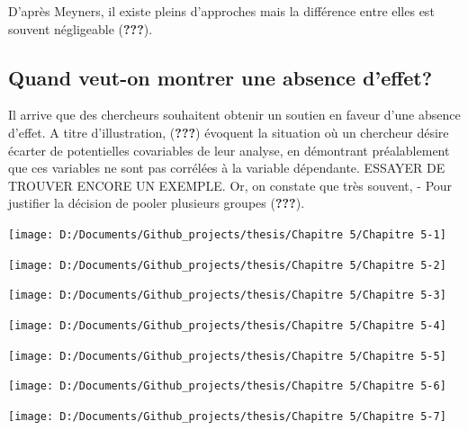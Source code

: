 \documentclass[
  english,
  man]{apa6}
\begin{document}
D'après Meyners, il existe pleins d'approches mais la différence entre elles est souvent négligeable ({\textbf{???}}).

\hypertarget{quand-veut-on-montrer-une-absence-deffet}{%
\subsection{Quand veut-on montrer une absence d'effet?}\label{quand-veut-on-montrer-une-absence-deffet}}

Il arrive que des chercheurs souhaitent obtenir un soutien en faveur d'une absence d'effet. A titre d'illustration, ({\textbf{???}}) évoquent la situation où un chercheur désire écarter de potentielles covariables de leur analyse, en démontrant préalablement que ces variables ne sont pas corrélées à la variable dépendante. ESSAYER DE TROUVER ENCORE UN EXEMPLE. Or, on constate que très souvent,
- Pour justifier la décision de pooler plusieurs groupes ({\textbf{???}}).

\begin{center}\texttt{[image: D:/Documents/Github\_projects/thesis/Chapitre 5/Chapitre 5-1]} \end{center}

\begin{center}\texttt{[image: D:/Documents/Github\_projects/thesis/Chapitre 5/Chapitre 5-2]} \end{center}

\begin{center}\texttt{[image: D:/Documents/Github\_projects/thesis/Chapitre 5/Chapitre 5-3]} \end{center}

\begin{center}\texttt{[image: D:/Documents/Github\_projects/thesis/Chapitre 5/Chapitre 5-4]} \end{center}

\begin{center}\texttt{[image: D:/Documents/Github\_projects/thesis/Chapitre 5/Chapitre 5-5]} \end{center}

\begin{center}\texttt{[image: D:/Documents/Github\_projects/thesis/Chapitre 5/Chapitre 5-6]} \end{center}

\begin{center}\texttt{[image: D:/Documents/Github\_projects/thesis/Chapitre 5/Chapitre 5-7]} \end{center}
\end{document}
